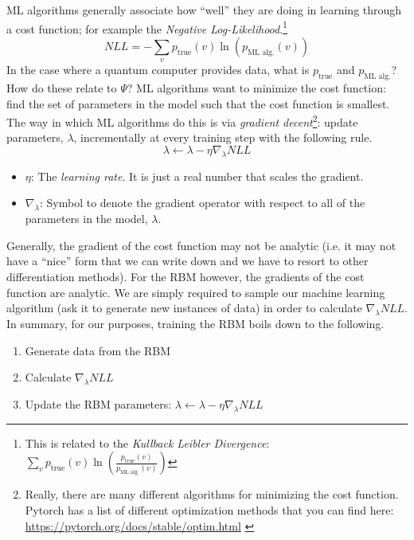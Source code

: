 \documentclass[12pt]{article}
\begin{document}
ML algorithms generally associate how ``well'' they are doing in learning through a cost function; for example the {\it Negative Log-Likelihood}.\footnote{This is related to the {\it Kullback Leibler Divergence}: $\sum_{v} p_{\text{true}}(v) \ln(\frac{p_{\text{true}}(v)}{p_{\text{ML alg.}}(v)})$}
\begin{equation}
    NLL = -\sum_{v} p_{\text{true}}(v) \ln(p_{\text{ML alg.}}(v))
\end{equation}
In the case where a quantum computer provides data, what is $p_{\text{true}}$ and $p_{\text{ML alg.}}$?  How do these relate to $\Psi$?
ML algorithms want to minimize the cost function: find the set of parameters in the model such that the cost function is smallest. The way in which ML algorithms do this is via {\it gradient decent}\footnote{Really, there are many different algorithms for minimizing the cost function. Pytorch has a list of different optimization methods that you can find here: \textcolor{blue}{ \href{https://pytorch.org/docs/stable/optim.html}{https://pytorch.org/docs/stable/optim.html} }}: update parameters, $\lambda$, incrementally at every training step with the following rule.
\begin{equation}
    \lambda \leftarrow \lambda - \eta \nabla_{\lambda}NLL
\end{equation}
\begin{itemize}
    \item $\eta$: The {\it learning rate}. It is just a real number that scales the gradient.
    \item $\nabla_{\lambda}$: Symbol to denote the gradient operator with respect to all of the parameters in the model, $\lambda$.
\end{itemize}

Generally, the gradient of the cost function may not be analytic (i.e. it may not have a ``nice'' form that we can write down and we have to resort to other differentiation methods). For the RBM however, the gradients of the cost function are analytic. We are simply required to sample our machine learning algorithm (ask it to generate new instances of data) in order to calculate $\nabla_{\lambda}NLL$.
In summary, for our purposes, training the RBM boils down to the following.

\begin{enumerate}
    \item Generate data from the RBM
    \item Calculate $\nabla_{\lambda}NLL$
    \item Update the RBM parameters: $\lambda \leftarrow \lambda - \eta \nabla_{\lambda}NLL$
\end{enumerate}
\end{document}
